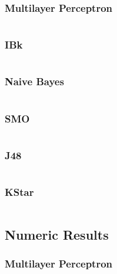 \subsubsection{Multilayer Perceptron}
\inputminted[fontsize=\footnotesize,breaklines=true]{text}{../data/processed/third/balanced/nominal-multilayer-perceptron.txt}
\clearpage

\subsubsection{IBk}
\inputminted[fontsize=\footnotesize,breaklines=true]{text}{../data/processed/third/balanced/nominal-ibk-1.txt}
\clearpage

\subsubsection{Naive Bayes}
\inputminted[fontsize=\footnotesize,breaklines=true]{text}{../data/processed/third/balanced/nominal-naive-bayes.txt}
\clearpage

\subsubsection{SMO}
\inputminted[fontsize=\footnotesize,breaklines=true]{text}{../data/processed/third/balanced/nominal-smo.txt}
\clearpage

\subsubsection{J48}
\inputminted[fontsize=\footnotesize,breaklines=true]{text}{../data/processed/third/balanced/nominal-j48.txt}
\clearpage

\subsubsection{KStar}
\inputminted[fontsize=\footnotesize,breaklines=true]{text}{../data/processed/third/balanced/nominal-kstar.txt}
\clearpage


\subsection{Numeric Results}
\subsubsection{Multilayer Perceptron}
\inputminted[fontsize=\footnotesize,breaklines=true]{text}{../data/processed/third/unbalanced/numeric-multilayer-perceptron.txt}
\clearpage

